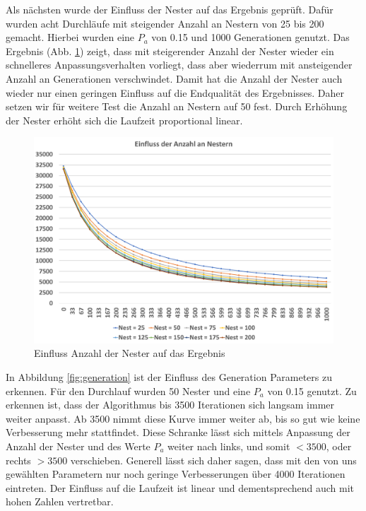 \documentclass[conference]{IEEEtran}
\begin{document}
      Als nächsten wurde der Einfluss der Nester auf das Ergebnis geprüft. Dafür wurden acht Durchläufe mit steigender Anzahl an Nestern von 25 bis 200 
      gemacht. Hierbei wurden eine $P_a$ von 0.15 und 1000 Generationen genutzt. Das Ergebnis (Abb. \ref{fig:nests}) zeigt, dass mit steigerender Anzahl der Nester wieder
      ein schnelleres Anpassungsverhalten vorliegt, dass aber wiederrum mit ansteigender Anzahl an Generationen verschwindet. Damit hat die Anzahl der Nester auch wieder
      nur einen geringen Einfluss auf die Endqualität des Ergebnisses. Daher setzen wir für weitere Test die Anzahl an Nestern auf 50 fest.
      Durch Erhöhung der Nester erhöht sich die Laufzeit proportional linear.
 

      \begin{figure}[b]
        \centering
        \includegraphics[width=1\linewidth]{Nester.png}
        \caption{Einfluss Anzahl der Nester auf das Ergebnis}
        \label{fig:nests}
      \end{figure}

      In Abbildung \ref{fig:generation} ist der Einfluss des Generation Parameters zu erkennen. Für den Durchlauf wurden 50 Nester und eine $P_a$ von 0.15 genutzt. 
      Zu erkennen ist, dass der Algorithmus bis 3500 Iterationen sich langsam immer weiter anpasst. Ab 3500 nimmt diese Kurve immer weiter ab, bis so gut wie keine Verbesserung
      mehr stattfindet. Diese Schranke lässt sich mittels Anpassung der Anzahl der Nester und des Werte $P_a$ weiter nach links, und somit $<3500$, oder rechts $>3500$ verschieben.
      Generell lässt sich daher sagen, dass mit den von uns gewählten Parametern nur noch geringe Verbesserungen über 4000 Iterationen eintreten.
      Der Einfluss auf die Laufzeit ist linear und dementsprechend auch mit hohen Zahlen vertretbar.
\end{document}

